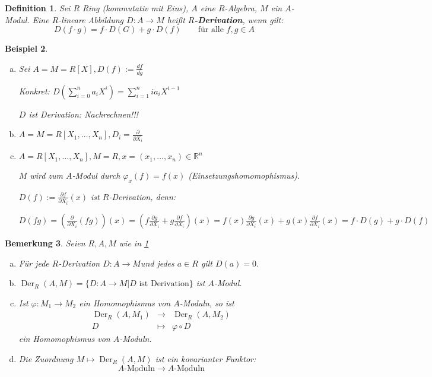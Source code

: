 \documentclass[a4paper, 12pt, numbers=noendperiod, chapterprefix=true]{scrbook}
\theoremstyle{break}
\newtheorem{Def}{Definition}[section]
\newtheorem{Bem}[Def]{Bemerkung}
\newtheorem{Bsp}[Def]{Beispiel}
\theoremstyle{nonumberbreak}
\theoremstyle{nonumberplain}
\newcommand{\emp}[1]{\textbf{\emph{#1}}}
\newcommand{\deftermspec}[2]{{\index{#2}}\emp{#1}}
\newcommand{\Sum}{\sum\limits}
\DeclareMathOperator{\Der}{Der}
\newcommand{\R}{\mathbb{R}}
\begin{document}
\begin{Def}\label{Def17.1}
Sei $R$ Ring (kommutativ mit Eins), $A$ eine $R$-Algebra, $M$ ein $A$-Modul. Eine $R$-lineare Abbildung $D:A\to M$ hei\ss t \deftermspec{$R$-Derivation}{Derivation}, wenn gilt:
	\[ D(f\cdot g)=f\cdot D(G) + g\cdot D(f) \qquad \text{f\"ur alle }f,g \in A\]
\end{Def}

\begin{Bsp}\label{Bsp17.2}\begin{enumerate}[a)]
\item\label{Bsp17.2a}
	Sei $A=M=R[X], D(f):=\frac{df}{dg}$
	
	Konkret: $D(\Sum_{i=0}^n a_iX^i)=\Sum_{i=1}^nia_iX^{i-1}$
	
	\emph{$D$ ist Derivation:} Nachrechnen!!!
\item
	$A=M=R[X_1,\ldots ,X_n], D_i=\frac{\partial}{\partial X_i}$
\item\label{Bsp17.2c}
	$A=R[X_1,\ldots ,X_n], M=R, x=(x_1,\ldots ,x_n)\in \R^n$
	
	$M$ wird zum $A$-Modul durch $\varphi_x(f)=f(x)$ (Einsetzungshomomophismus).
	
	$D(f):=\frac{\partial f}{\partial X_i}(x)$ ist $R$-Derivation, \emph{denn:}
	
	$D(fg)=(\frac{\partial}{\partial X_i}(fg))(x)=(f\frac{\partial g}{\partial X_i}+g\frac{\partial f}{\partial X_i})(x) = f(x)\frac{\partial g}{\partial X_i}(x) + g(x)\frac{\partial f}{\partial X_i}(x) = f\cdot D(g) + g\cdot D(f)$
\end{enumerate}\end{Bsp}

\begin{Bem}\label{Bem17.3}Seien $R,A,M$ wie in \ref{Def17.1}\begin{enumerate}[a)]
\item
	F\"ur jede $R$-Derivation $D:A\to M$und jedes $a\in R$ gilt $D(a)=0$.
\item
	$\Der_R(A,M)=\{D:A\to M| D \text{ ist Derivation}\}$ ist $A$-Modul.
\item\label{Bem17.3c}
	Ist $\varphi:M_1\to M_2$ ein Homomophismus von $A$-Moduln, so ist \[\begin{array}{rcl}\Der_R(A,M_1)&\to&\Der_R(A,M_2)\\D&\mapsto&\varphi\circ D\end{array}\] ein Homomophismus von $A$-Moduln.
\item
	Die Zuordnung $M\mapsto\Der_R(A,M)$ ist ein kovarianter Funktor:
		\[ \underline{A\text{-Moduln}} \to \underline{A\text{-Moduln}} \]
\end{enumerate}\end{Bem}
\end{document}
